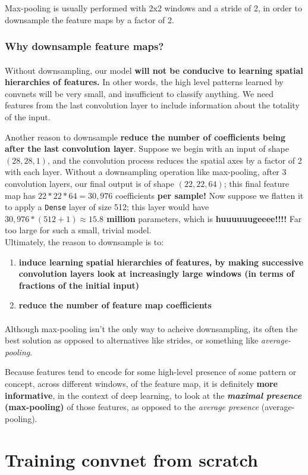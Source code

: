 \documentclass[12pt, a4paper]{article}
\begin{document}
Max-pooling is usually performed with 2x2 windows and a stride of 2, in order 
to downsample the feature maps by a factor of 2.

\subsubsection{Why downsample feature maps?}
\paragraph*{}
Without downsampling, our model \textbf{will not be conducive to learning 
spatial hierarchies of features.} In other words, the high level patterns learned 
by convnets will be very small, and insufficient to classify anything. We need features 
from the last convolution layer to include information about the totality of the input.

Another reason to downsample \textbf{reduce the number of coefficients being after the last 
convolution layer}. Suppose we begin with an input of shape $(28, 28, 1)$, and 
the convolution process reduces the spatial axes by a factor of 2 with each layer.
Without a downsampling operation like max-pooling, after 3 convolution layers, 
our final output is of shape $(22, 22, 64)$; this final feature map has 
\textbf{$22 * 22 * 64 = 30,976$} coefficients \textbf{per sample!}
Now suppose we flatten it to apply a \lstinline{Dense} layer of size 512; this layer 
would have \textbf{$30,976 * (512+1) \approx 15.8$ million} parameters, which is 
\textbf{huuuuuugeeee!!!!} Far too large for such a small, trivial model. \\

Ultimately, the reason to downsample is to:
\begin{enumerate}
   \item \textbf{induce learning spatial 
   hierarchies of features, by making successive convolution layers look at increasingly large windows 
   (in terms of fractions of the initial input)}

   \item \textbf{reduce the number of feature map coefficients}
\end{enumerate}


\paragraph*{}
Although max-pooling isn't the only way to acheive downsampling, its often 
the best solution as opposed to alternatives like strides, or something 
like \textit{average-pooling}.

Because features tend to encode for some high-level presence of some pattern or concept,
across different windows, of the feature map, it is definitely \textbf{more informative},
in the context of deep learning, to look at the \textbf{\textit{maximal presence} (max-pooling)}
of those features, as opposed to the \textit{average presence} (average-pooling).


\newpage

\section{Training convnet from scratch}
\end{document}
